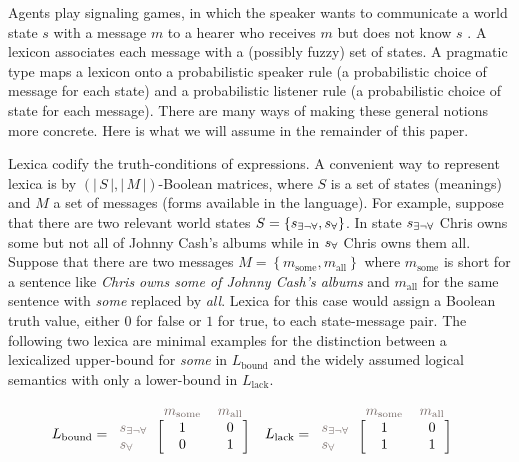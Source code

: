 \documentclass[a4paper, 11pt]{article}
\theoremstyle{Satz}
\newcommand{\set}[1]{\left\{#1\right\}}
\newcommand{\card}[1]{\left \lvert \, #1 \, \right\rvert}
\newcommand{\States}{\ensuremath{S}\xspace}		%
\newcommand{\state}{\ensuremath{s}\xspace}		%
\newcommand{\mystate}[1]{\ensuremath{\state_{\text{#1}}}\xspace} %
\newcommand{\mylang}[1]{\ensuremath{L_{\text{#1}}}\xspace} %
\newcommand{\Messgs}{\ensuremath{M}\xspace}		%
\newcommand{\messg}{\ensuremath{m}\xspace}		%
\newcommand{\mymessg}[1]{\ensuremath{\messg_{\text{#1}}}\xspace} %
\newcommand{\ssome}{\mystate{\ensuremath{\exists\neg\forall}}}
\newcommand{\sall}{\mystate{\ensuremath{\forall}}}
\newcommand{\msome}{\mymessg{some}}
\newcommand{\mall}{\mymessg{all}}
\newcommand{\Lbound}{\mylang{bound}}
\newcommand{\Llack}{\mylang{lack}}
\newcommand{\mygray}[1]{{\textcolor{mygray}{#1}}}
\begin{document}
Agents play signaling games, in which the speaker wants to communicate a world state $s$ with a
message $m$ to a hearer who receives $m$ but does not know $s$
\citep[e.g.][]{lewis:1969,Skyrms2010:Signals}. A lexicon associates each message with a
(possibly fuzzy) set of states. A pragmatic type maps a lexicon onto a probabilistic speaker
rule (a probabilistic choice of message for each state) and a probabilistic listener rule (a
probabilistic choice of state for each message). There are many ways of making these general
notions more concrete. Here is what we will assume in the remainder of this paper.

Lexica codify the truth-conditions of expressions. A convenient way to represent lexica is by
$(\card{\States}, \card{\Messgs})$-Boolean matrices, where $\States$ is a set of states
(meanings) and $M$ a set of messages (forms available in the language). For example, suppose
that there are two relevant world states $\States = \set{\ssome, \sall}$. In state $\ssome$
Chris owns some but not all of Johnny Cash's albums while in $\sall$ Chris owns them
all. Suppose that there are two messages $\Messgs = \set{\msome, \mall}$ where $\msome$ is
short for a sentence like \emph{Chris owns some of Johnny Cash's albums} and $\mall$ for the
same sentence with \emph{some} replaced by \emph{all}.  Lexica for this case would assign a
Boolean truth value, either $0$ for false or $1$ for true, to each state-message pair. The
following two lexica are minimal examples for the distinction between a lexicalized upper-bound
for \emph{some} in $\Lbound$ and the widely assumed logical semantics with only a lower-bound
in $\Llack$.

\begin{align*}
  \Lbound & = \begin{blockarray}{lcc}
    & \mygray{\msome} & \mygray{\mall} \\
    \begin{block}{l[cc]}
      \mygray{\ssome} & 1 & 0 \\
      \mygray{\sall}  & 0 & 1 \\
    \end{block}
  \end{blockarray} &
  \Llack & = \begin{blockarray}{lcc}
    & \mygray{\msome} & \mygray{\mall} \\
    \begin{block}{l[cc]}
      \mygray{\ssome} & 1 & 0 \\
      \mygray{\sall}  & 1 & 1 \\
    \end{block}
  \end{blockarray}
\end{align*}
\end{document}
